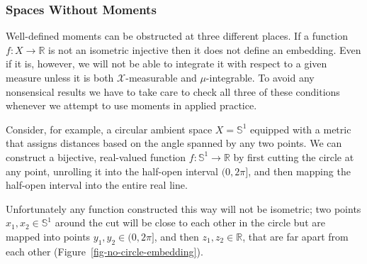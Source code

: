 \documentclass[
  letterpaper,
  DIV=11,
  numbers=noendperiod]{scrartcl}
\begin{document}
\hypertarget{spaces-without-moments}{%
\subsubsection{Spaces Without Moments}\label{spaces-without-moments}}

Well-defined moments can be obstructed at three different places. If a
function \(f : X \rightarrow \mathbb{R}\) is not an isometric injective
then it does not define an embedding. Even if it is, however, we will
not be able to integrate it with respect to a given measure unless it is
both \(\mathcal{X}\)-measurable and \(\mu\)-integrable. To avoid any
nonsensical results we have to take care to check all three of these
conditions whenever we attempt to use moments in applied practice.

Consider, for example, a circular ambient space \(X = \mathbb{S}^{1}\)
equipped with a metric that assigns distances based on the angle spanned
by any two points. We can construct a bijective, real-valued function
\(f : \mathbb{S}^{1} \rightarrow \mathbb{R}\) by first cutting the
circle at any point, unrolling it into the half-open interval
\((0, 2 \pi]\), and then mapping the half-open interval into the entire
real line.

Unfortunately any function constructed this way will not be isometric;
two points \(x_{1}, x_{2} \in \mathbb{S}^{1}\) around the cut will be
close to each other in the circle but are mapped into points
\(y_{1}, y_{2} \in (0, 2 \pi]\), and then
\(z_{1}, z_{2} \in \mathbb{R}\), that are far apart from each other
(Figure~\ref{fig-no-circle-embedding}).
\end{document}
